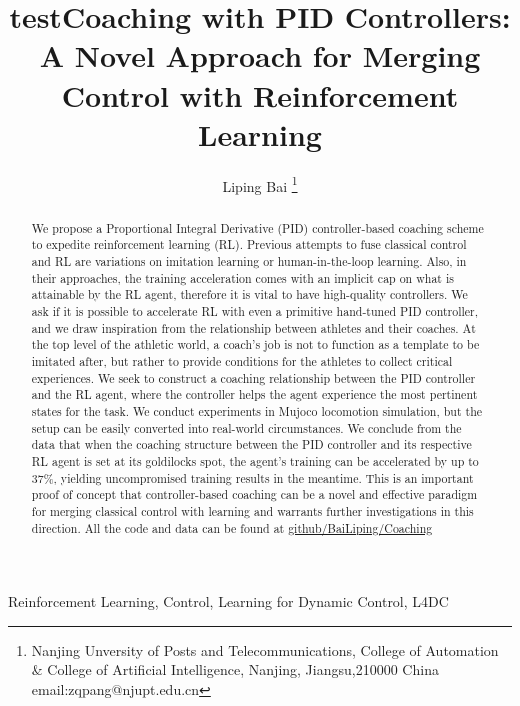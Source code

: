 \documentclass[journal]{IEEEtran}
\begin{document}
    \title{test}
\title{Coaching with PID Controllers: A Novel Approach for Merging Control with Reinforcement Learning}

\author{ Liping Bai \thanks{Nanjing Unversity of Posts and Telecommunications, College of Automation \& College of Artificial Intelligence, Nanjing, Jiangsu,210000 China email:zqpang@njupt.edu.cn}}
\maketitle
\begin{abstract}
We propose a Proportional Integral Derivative (PID) controller-based coaching scheme to expedite reinforcement learning (RL). Previous attempts to fuse classical control and RL are variations on imitation learning or human-in-the-loop learning. Also, in their approaches, the training acceleration comes with an implicit cap on what is attainable by the RL agent, therefore it is vital to have high-quality controllers. We ask if it is possible to accelerate RL with even a primitive hand-tuned PID controller, and we draw inspiration from the relationship between athletes and their coaches. At the top level of the athletic world, a coach's job is not to function as a template to be imitated after, but rather to provide conditions for the athletes to collect critical experiences. We seek to construct a coaching relationship between the PID controller and the RL agent, where the controller helps the agent experience the most pertinent states for the task. We conduct experiments in Mujoco locomotion simulation, but the setup can be easily converted into real-world circumstances. We conclude from the data that when the coaching structure between the PID controller and its respective RL agent is set at its goldilocks spot, the agent's training can be accelerated by up to 37\%, yielding uncompromised training results in the meantime. This is an important proof of concept that controller-based coaching can be a novel and effective paradigm for merging classical control with learning and warrants further investigations in this direction. All the code and data can be found at \href{https://github.com/BaiLiping/Coaching}{github/BaiLiping/Coaching}
\end{abstract}
\begin{IEEEkeywords}
Reinforcement Learning, Control, Learning for Dynamic Control, L4DC
\end{IEEEkeywords}
\IEEEpeerreviewmaketitle
\end{document}
